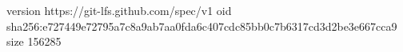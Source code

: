 version https://git-lfs.github.com/spec/v1
oid sha256:e727449e72795a7c8a9ab7aa0fda6c407cdc85bb0c7b6317cd3d2be3e667cca9
size 156285
